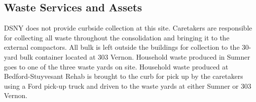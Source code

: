 \pagebreak
\restoregeometry
\textcolor{ccorange}{\section{Waste Services and Assets}}
DSNY does not provide curbside collection at this site. Caretakers are responsible for collecting all
waste throughout the consolidation and bringing it to the external compactors. All bulk is left outside the
buildings for collection to the 30-yard bulk container located at 303 Vernon. Household waste produced
in Sumner goes to one of the three waste yards on site. Household waste produced at
Bedford-Stuyvesant Rehab is brought to the curb for pick up by the caretakers using a Ford pick-up
truck and driven to the waste yards at either Sumner or 303 Vernon.
